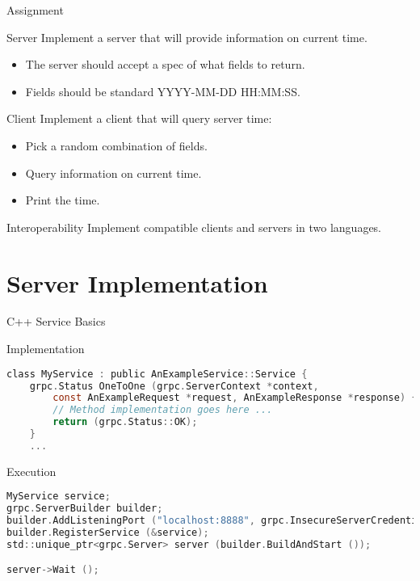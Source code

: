 \begin{frame}{Assignment}
    \begin{block}{Server}
        Implement a server that will provide information on current time.
        \begin{itemize}
            \item The server should accept a spec of what fields to return.
            \item Fields should be standard YYYY-MM-DD HH:MM:SS.
        \end{itemize}
    \end{block}

    \begin{block}{Client}
        Implement a client that will query server time:
        \begin{itemize}
            \item Pick a random combination of fields.
            \item Query information on current time.
            \item Print the time.
        \end{itemize}
    \end{block}

    \begin{block}{Interoperability}
        Implement compatible clients and servers in two languages.
    \end{block}
\end{frame}


\section{Server Implementation}


\begin{frame}[fragile]{C++ Service Basics}
    \begin{block}{Implementation}
\begin{lstlisting}[language=c,style=mini]
class MyService : public AnExampleService::Service {
    grpc.Status OneToOne (grpc.ServerContext *context,
        const AnExampleRequest *request, AnExampleResponse *response) {
        // Method implementation goes here ...
        return (grpc.Status::OK);
    }
    ...
\end{lstlisting}
    \end{block}
    \begin{block}{Execution}
\begin{lstlisting}[language=c,style=mini]
MyService service;
grpc.ServerBuilder builder;
builder.AddListeningPort ("localhost:8888", grpc.InsecureServerCredentials ());
builder.RegisterService (&service);
std::unique_ptr<grpc.Server> server (builder.BuildAndStart ());

server->Wait ();
\end{lstlisting}
    \end{block}
\end{frame}


